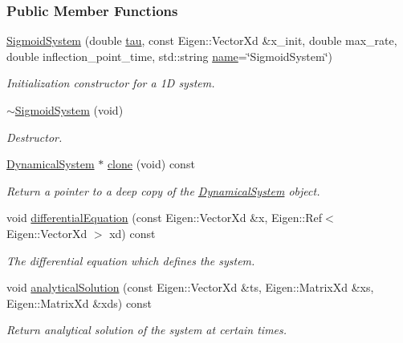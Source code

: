 \subsubsection*{Public Member Functions}
\begin{DoxyCompactItemize}
\item 
\hyperlink{classDmpBbo_1_1SigmoidSystem_a78f4cd6586d9465ac7e76407dc0e4379}{Sigmoid\+System} (double \hyperlink{group__DynamicalSystems_ga50eec7ad4c9664b5809ace45b22200d5}{tau}, const Eigen\+::\+Vector\+Xd \&x\+\_\+init, double max\+\_\+rate, double inflection\+\_\+point\+\_\+time, std\+::string \hyperlink{group__DynamicalSystems_gacd23346c798f78014a4f82c853e83c88}{name}=\char`\"{}Sigmoid\+System\char`\"{})
\begin{DoxyCompactList}\small\item\em Initialization constructor for a 1\+D system. \end{DoxyCompactList}\item 
\hyperlink{classDmpBbo_1_1SigmoidSystem_af744b2bd37d35e183f27708227339a93}{$\sim$\+Sigmoid\+System} (void)
\begin{DoxyCompactList}\small\item\em Destructor. \end{DoxyCompactList}\item 
\hyperlink{classDmpBbo_1_1DynamicalSystem}{Dynamical\+System} $\ast$ \hyperlink{classDmpBbo_1_1SigmoidSystem_a16b3e8da712b58f8295cbb7951bebf68}{clone} (void) const 
\begin{DoxyCompactList}\small\item\em Return a pointer to a deep copy of the \hyperlink{classDmpBbo_1_1DynamicalSystem}{Dynamical\+System} object. \end{DoxyCompactList}\item 
void \hyperlink{classDmpBbo_1_1SigmoidSystem_ab564468764e7e4dc7c11e2a786e22c19}{differential\+Equation} (const Eigen\+::\+Vector\+Xd \&x, Eigen\+::\+Ref$<$ Eigen\+::\+Vector\+Xd $>$ xd) const 
\begin{DoxyCompactList}\small\item\em The differential equation which defines the system. \end{DoxyCompactList}\item 
void \hyperlink{classDmpBbo_1_1SigmoidSystem_ab6600b58b35bc9e66673d16f68e2e919}{analytical\+Solution} (const Eigen\+::\+Vector\+Xd \&ts, Eigen\+::\+Matrix\+Xd \&xs, Eigen\+::\+Matrix\+Xd \&xds) const 
\begin{DoxyCompactList}\small\item\em Return analytical solution of the system at certain times. \end{DoxyCompactList}\item 

\end{DoxyCompactItemize}
